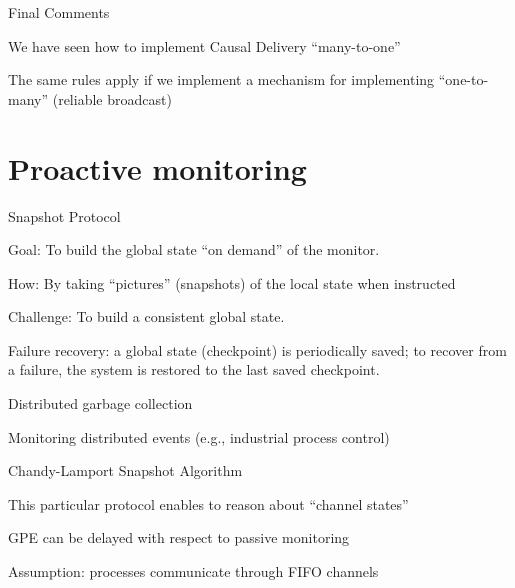 \begin{frame}{Final Comments}
\BIL
\item We have seen how to implement Causal Delivery ``many-to-one'' 
\item The same rules apply if we implement a mechanism for 
  implementing ``one-to-many'' (reliable broadcast)
\EIL
\end{frame}

\section{Proactive monitoring}

\begin{frame}{Snapshot Protocol}

\BI
\item \alert{Goal}:
To build the global state “on demand” of the monitor.
\item \alert{How}:
By taking ``pictures'' (snapshots) of the local state when instructed
\item \alert{Challenge}:
To build a consistent global state.
\EI

\BI
\item Failure recovery: a global state (\alert{checkpoint}) is periodically saved; 
  to recover from a failure, the system is restored to the last saved
  checkpoint.
\item Distributed garbage collection
\item Monitoring distributed events (e.g., industrial process control)
\EI
\end{frame}

\begin{frame}{Chandy-Lamport Snapshot Algorithm}

\BI
\item This particular protocol enables to reason about ``channel states''
\item GPE can be delayed with respect to passive monitoring
\item Assumption: processes communicate through FIFO channels
\EI

\end{frame}

